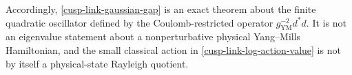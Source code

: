 Accordingly, \eqref{cusp-link-gaussian-gap} is an exact theorem about the
finite quadratic oscillator defined by the Coulomb-restricted operator
\(g_{\mathrm{YM}}^{-2}d^*d\).  It is not an eigenvalue statement about a
nonperturbative physical Yang--Mills
Hamiltonian, and the small classical action in
\eqref{cusp-link-log-action-value} is not by itself a physical-state Rayleigh
quotient.
